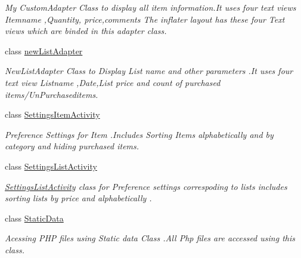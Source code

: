 \begin{DoxyCompactItemize}
\begin{DoxyCompactList}\small\item\em My Custom\+Adapter Class to display all item information.\+It uses four text views Itemname ,Quantity, price,comments The inflater layout has these four Text views which are binded in this adapter class. \end{DoxyCompactList}\item 
class \hyperlink{classcom_1_1example_1_1santh_1_1shoppinglist_1_1new_list_adapter}{new\+List\+Adapter}
\begin{DoxyCompactList}\small\item\em New\+List\+Adapter Class to Display List name and other parameters .It uses four text view Listname ,Date,List price and count of purchased items/\+Un\+Purchaseditems. \end{DoxyCompactList}\item 
class \hyperlink{classcom_1_1example_1_1santh_1_1shoppinglist_1_1_settings_item_activity}{Settings\+Item\+Activity}
\begin{DoxyCompactList}\small\item\em Preference Settings for Item .Includes Sorting Items alphabetically and by category and hiding purchased items. \end{DoxyCompactList}\item 
class \hyperlink{classcom_1_1example_1_1santh_1_1shoppinglist_1_1_settings_list_activity}{Settings\+List\+Activity}
\begin{DoxyCompactList}\small\item\em \hyperlink{classcom_1_1example_1_1santh_1_1shoppinglist_1_1_settings_list_activity}{Settings\+List\+Activity} class for Preference settings correspoding to lists includes sorting lists by price and alphabetically . \end{DoxyCompactList}\item 
class \hyperlink{classcom_1_1example_1_1santh_1_1shoppinglist_1_1_static_data}{Static\+Data}
\begin{DoxyCompactList}\small\item\em Acessing P\+HP files using Static data Class .All Php files are accessed using this class. \end{DoxyCompactList}\end{DoxyCompactItemize}
